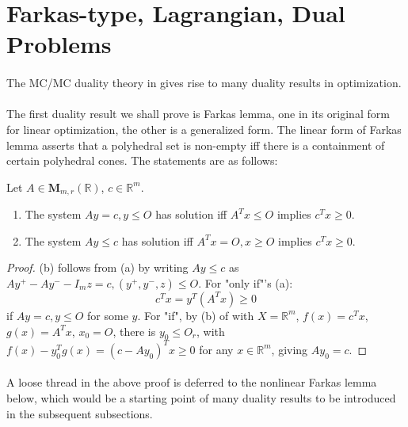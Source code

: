 \section{Farkas-type, Lagrangian, Dual Problems}
\label{sect:041}

\paragraph{}The MC/MC duality theory in  gives rise to many duality results in optimization.

\paragraph{}The first duality result we shall prove is Farkas lemma, one in its original form for linear optimization, the other is a generalized form. The linear form of Farkas lemma asserts that a polyhedral set is non-empty iff there is a containment of certain polyhedral cones. The statements are as follows:

\begin{prop}\label{prop:041-farkas-lemma-linear}
	Let $A\in \mathbf{M}_{m,r}(\mathbb{R})$, $c\in \mathbb{R}^m$.
	\begin{enumerate}[label=(\alph*)]
		\item The system $Ay=c,y\leq O$ has solution iff $A^Tx\leq O$ implies $c^Tx\geq 0$.
		\item The system $Ay\leq c$ has solution iff $A^Tx=O,x\geq O$ implies $c^Tx\geq 0$.
	\end{enumerate}
\end{prop}

\begin{proof}
	(b) follows from (a) by writing $Ay\leq c$ as $Ay^+-Ay^--I_mz=c,(y^+,y^-,z)\leq O$. For "only if"'s (a):
	\[
		c^Tx=y^T(A^Tx)\geq 0
	\]
	if $Ay=c,y\leq O$ for some $y$. For "if", by (b) of  with $X=\mathbb{R}^m$, $f(x)=c^Tx$, $g(x)=A^Tx$, $x_0=O$, there is $y_0\leq O_r$, with $f(x)-y_0^Tg(x)=(c-Ay_0)^Tx\geq 0$ for any $x\in \mathbb{R}^m$, giving $Ay_0=c$.
\end{proof}

\paragraph{}A loose thread in the above proof is deferred to the nonlinear Farkas lemma below, which would be a starting point of many duality results to be introduced in the subsequent subsections.

